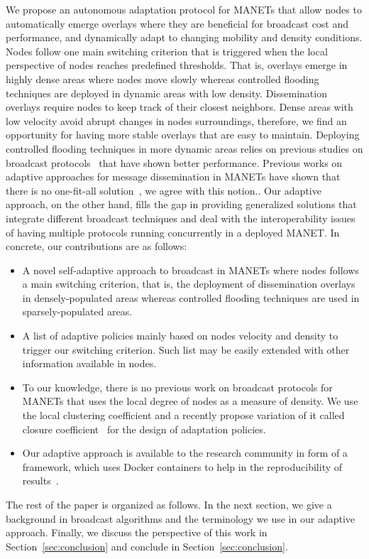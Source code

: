 We propose an autonomous adaptation protocol for MANETs that allow nodes to automatically emerge overlays where they are beneficial for broadcast cost and performance, and dynamically adapt to changing mobility and density conditions.
%
Nodes follow one main switching criterion that is triggered when the local perspective of nodes reaches predefined thresholds.
%
That is, overlays emerge in highly dense areas where nodes move slowly whereas controlled flooding techniques are deployed in dynamic areas with low density.
%
Dissemination overlays require nodes to keep track of their closest neighbors.
%
Dense areas with low velocity avoid abrupt changes in nodes surroundings, therefore, we find an opportunity for having more stable overlays that are easy to maintain.
%
Deploying controlled flooding techniques in more dynamic areas relies on previous studies on broadcast protocols~\cite{adaptive_group_com_iscc02} that have shown better performance. 
%
Previous works on adaptive approaches for message dissemination in MANETs have shown that there is no one-fit-all solution~\cite{adaptive_group_com_iscc02}, we agree with this notion..
%
Our adaptive approach, on the other hand, fills the gap in providing generalized solutions that integrate different broadcast techniques and deal with the interoperability issues of having multiple protocols running concurrently in a deployed MANET.
%
In concrete, our contributions are as follows:
\begin{itemize}
	\item A novel self-adaptive approach to broadcast in MANETs where nodes follows a main switching criterion, that is, the deployment of dissemination overlays in densely-populated areas whereas controlled flooding techniques are used in sparsely-populated areas.
	\item A list of adaptive policies mainly based on nodes velocity and density to trigger our switching criterion. Such list may be easily extended with other information available in nodes.
	\item To our knowledge, there is no previous work on broadcast protocols for MANETs that uses the local degree of nodes as a measure of density. We use the local clustering coefficient and a recently propose variation of it called closure coefficient~\cite{closure_coef} for the design of adaptation policies.
	\item Our adaptive approach is available to the research community in form of a framework, which uses Docker containers to help in the reproducibility of results~\cite{emergent_overlays_repo}.
\end{itemize}


The rest of the paper is organized as follows.
%
In the next section, we give a background in broadcast algorithms and the terminology we use in our adaptive approach.
%
%
Finally, we discuss the perspective of this work in Section~\ref{sec:conclusion} and conclude in Section~\ref{sec:conclusion}.
